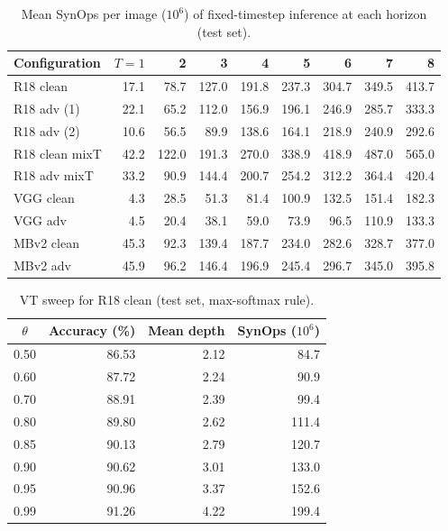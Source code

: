 \begin{table}[htbp]
\centering
\caption[SynOps of fixed-timestep inference]{Mean SynOps per image ($10^6$) of fixed-timestep inference at each horizon (test set).}
\label{tab:app-fixed-synops}
\footnotesize
\begin{tabular}{@{}l rrrrrrrr@{}}
\toprule
Configuration & $T{=}1$ & 2 & 3 & 4 & 5 & 6 & 7 & 8 \\
\midrule
R18 clean & 17.1 & 78.7 & 127.0 & 191.8 & 237.3 & 304.7 & 349.5 & 413.7 \\
R18 adv (1) & 22.1 & 65.2 & 112.0 & 156.9 & 196.1 & 246.9 & 285.7 & 333.3 \\
R18 adv (2) & 10.6 & 56.5 & 89.9 & 138.6 & 164.1 & 218.9 & 240.9 & 292.6 \\
R18 clean mixT & 42.2 & 122.0 & 191.3 & 270.0 & 338.9 & 418.9 & 487.0 & 565.0 \\
R18 adv mixT & 33.2 & 90.9 & 144.4 & 200.7 & 254.2 & 312.2 & 364.4 & 420.4 \\
VGG clean & 4.3 & 28.5 & 51.3 & 81.4 & 100.9 & 132.5 & 151.4 & 182.3 \\
VGG adv & 4.5 & 20.4 & 38.1 & 59.0 & 73.9 & 96.5 & 110.9 & 133.3 \\
MBv2 clean & 45.3 & 92.3 & 139.4 & 187.7 & 234.0 & 282.6 & 328.7 & 377.0 \\
MBv2 adv & 45.9 & 96.2 & 146.4 & 196.9 & 245.4 & 296.7 & 345.0 & 395.8 \\
\bottomrule
\end{tabular}
\end{table}

\begin{table}[htbp]
\centering
\caption{VT sweep for R18 clean (test set, max-softmax rule).}
\label{tab:app-vt-r18_clean_T8}
\footnotesize
\begin{tabular}{@{}c r r r@{}}
\toprule
$\theta$ & Accuracy (\%) & Mean depth & SynOps ($10^6$) \\
\midrule
0.50 & 86.53 & 2.12 & 84.7 \\
0.60 & 87.72 & 2.24 & 90.9 \\
0.70 & 88.91 & 2.39 & 99.4 \\
0.80 & 89.80 & 2.62 & 111.4 \\
0.85 & 90.13 & 2.79 & 120.7 \\
0.90 & 90.62 & 3.01 & 133.0 \\
0.95 & 90.96 & 3.37 & 152.6 \\
0.99 & 91.26 & 4.22 & 199.4 \\
\bottomrule
\end{tabular}
\end{table}

